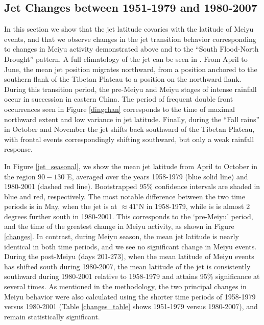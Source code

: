 \documentclass[draft,grl]{AGUTeX}
\begin{document}
\begin{article}
\section{Jet Changes between 1951-1979 and 1980-2007}

	In this section we show that the jet latitude covaries with the latitude of Meiyu events, and that we observe changes in the jet transition behavior corresponding to changes in Meiyu activity demonstrated above and to the ``South Flood-North Drought'' pattern. A full climatology of the jet can be seen in \citet{Schiemann2009}. From April to June, the mean jet position migrates northward, from a position anchored to the southern flank of the Tibetan Plateau to a position on the northward flank. During this transition period, the pre-Meiyu and Meiyu stages of intense rainfall occur in succession in eastern China. The period of frequent double front occurrences seen in Figure \ref{dingchan} corresponds to the time of maximal northward extent and low variance in jet latitude. Finally, during the ``Fall rains'' in October and November the jet shifts back southward of the Tibetan Plateau, with frontal events correspondingly shifting southward, but only a weak rainfall response.

	In Figure \ref{jet_seasonal}, we show the mean jet latitude from April to October in the region $90-130^\circ$E, averaged over the years 1958-1979 (blue solid line) and 1980-2001 (dashed red line). Bootstrapped 95\% confidence intervals are shaded in blue and red, respectively. The most notable difference between the two time periods is in May, when the jet is at $\approx 41^\circ$N in 1958-1979, while is is almost $2$ degrees further south in 1980-2001. This corresponds to the `pre-Meiyu' period, and the time of the greatest change in Meiyu activity, as shown in Figure \ref{changes}. In contrast, during Meiyu season, the mean jet latitude is nearly identical in both time periods, and we see no significant change in Meiyu events. During the post-Meiyu (days 201-273), when the mean latitude of Meiyu events has shifted south during 1980-2007, the mean latitude of the jet is consistently southward during 1980-2001 relative to 1958-1979 and attains 95\% significance at several times. As mentioned in the methodology, the two principal changes in Meiyu behavior were also calculated using the shorter time periods of 1958-1979 versus 1980-2001 (Table \ref{changes_table} shows 1951-1979 versus 1980-2007), and remain statistically significant.
	

\end{article}
\end{document}

